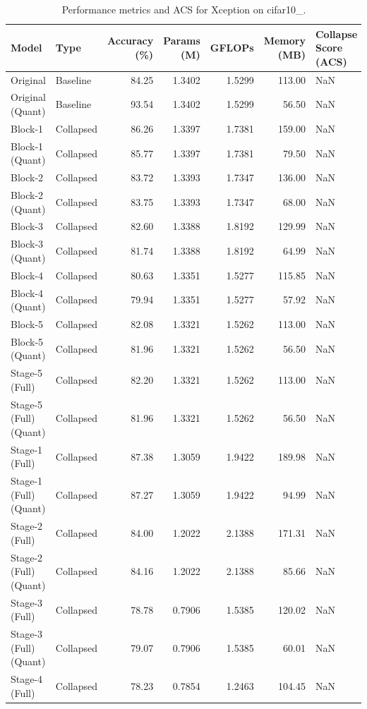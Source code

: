 \begin{table}
\caption{Performance metrics and ACS for Xception on cifar10_.}
\label{tab:Xception_cifar10_}
\begin{tabular}{llrrrrl}
\toprule
Model & Type & Accuracy (\%) & Params (M) & GFLOPs & Memory (MB) & Collapse Score (ACS) \\
\midrule
Original & Baseline & 84.25 & 1.3402 & 1.5299 & 113.00 & NaN \\
Original
(Quant) & Baseline & 93.54 & 1.3402 & 1.5299 & 56.50 & NaN \\
Block-1 & Collapsed & 86.26 & 1.3397 & 1.7381 & 159.00 & NaN \\
Block-1
(Quant) & Collapsed & 85.77 & 1.3397 & 1.7381 & 79.50 & NaN \\
Block-2 & Collapsed & 83.72 & 1.3393 & 1.7347 & 136.00 & NaN \\
Block-2
(Quant) & Collapsed & 83.75 & 1.3393 & 1.7347 & 68.00 & NaN \\
Block-3 & Collapsed & 82.60 & 1.3388 & 1.8192 & 129.99 & NaN \\
Block-3
(Quant) & Collapsed & 81.74 & 1.3388 & 1.8192 & 64.99 & NaN \\
Block-4 & Collapsed & 80.63 & 1.3351 & 1.5277 & 115.85 & NaN \\
Block-4
(Quant) & Collapsed & 79.94 & 1.3351 & 1.5277 & 57.92 & NaN \\
Block-5 & Collapsed & 82.08 & 1.3321 & 1.5262 & 113.00 & NaN \\
Block-5
(Quant) & Collapsed & 81.96 & 1.3321 & 1.5262 & 56.50 & NaN \\
Stage-5 (Full) & Collapsed & 82.20 & 1.3321 & 1.5262 & 113.00 & NaN \\
Stage-5 (Full)
(Quant) & Collapsed & 81.96 & 1.3321 & 1.5262 & 56.50 & NaN \\
Stage-1 (Full) & Collapsed & 87.38 & 1.3059 & 1.9422 & 189.98 & NaN \\
Stage-1 (Full)
(Quant) & Collapsed & 87.27 & 1.3059 & 1.9422 & 94.99 & NaN \\
Stage-2 (Full) & Collapsed & 84.00 & 1.2022 & 2.1388 & 171.31 & NaN \\
Stage-2 (Full)
(Quant) & Collapsed & 84.16 & 1.2022 & 2.1388 & 85.66 & NaN \\
Stage-3 (Full) & Collapsed & 78.78 & 0.7906 & 1.5385 & 120.02 & NaN \\
Stage-3 (Full)
(Quant) & Collapsed & 79.07 & 0.7906 & 1.5385 & 60.01 & NaN \\
Stage-4 (Full) & Collapsed & 78.23 & 0.7854 & 1.2463 & 104.45 & NaN \\

\end{tabular}
\end{table}
